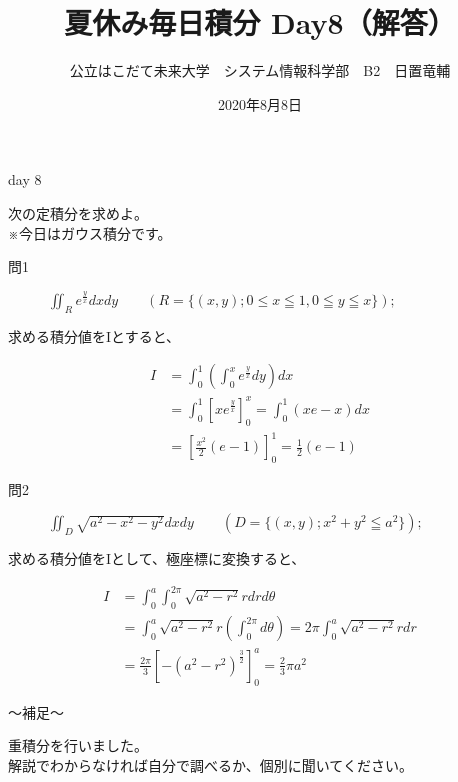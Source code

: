 \documentclass[dvipdfmx,uplatex]{jsarticle}
\title{夏休み毎日積分 Day8（解答）}
\author{公立はこだて未来大学　システム情報科学部　B2　日置竜輔}
\date{2020年8月8日}
\begin{document}
\maketitle

\begin{itembox}{day 8 }
    \begin{center}
        次の定積分を求めよ。\\
        ※今日はガウス積分です。
    \end{center}
\end{itembox}

\begin{description}
    \item [問1] $\displaystyle \iint_R e^{\frac{y}{x}} dxdy \qquad (R = \{(x,y); 0 \leq x \leqq 1, 0 \leqq y \leqq x\});$
\end{description}

求める積分値をIとすると、

\begin{align*}
    I &= \int_0^1 \left( \int_0^x e^\frac{y}{x} dy\right) dx \\
    &= \int_0^1 \left[ xe^\frac{y}{x}\right]_0^x = \int_0^1 (xe - x) dx \\
    &= \left[ \frac{x^2}{2}(e - 1)\right]_0^1 = \frac{1}{2}(e - 1)
\end{align*}

\begin{description}
    \item [問2] $\displaystyle \iint_D \sqrt{a^2 - x^2 - y^2} dxdy \qquad (D = \{(x,y); x^2 + y^2 \leqq a^2\});$
\end{description}

求める積分値をIとして、極座標に変換すると、

\begin{align*}
    I &= \int_0^a\int_0^{2\pi} \sqrt{a^2 - r^2} rdrd\theta \\
    &= \int_0^a \sqrt{a^2 - r^2} r \left(\int_0^{2\pi} d\theta \right) = 2\pi \int_0^a \sqrt{a^2 - r^2}rdr \\
    &= \frac{2\pi}{3}\left[ - \left(a^2 - r^2\right)^\frac{3}{2}\right]_0^a = \frac{2}{3}{\pi}a^2
\end{align*}

\begin{boxnote}
    〜補足〜
    \begin{center}
        重積分を行いました。\\
        解説でわからなければ自分で調べるか、個別に聞いてください。
    \end{center}
\end{boxnote}
\end{document}
